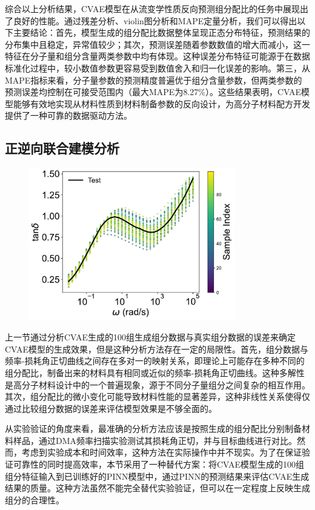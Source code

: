 综合以上分析结果，CVAE模型在从流变学性质反向预测组分配比的任务中展现出了良好的性能。通过残差分析、violin图分析和MAPE定量分析，我们可以得出以下主要结论：首先，模型生成的组分配比数据整体呈现正态分布特征，预测结果的分布集中且稳定，异常值较少；其次，预测误差随着参数数值的增大而减小，这一特征在分子量和组分含量两类参数中均有体现。这种误差分布特征可能源于在数据标准化过程中，较小数值参数更容易受到数值舍入和归一化误差的影响。第三，从MAPE指标来看，分子量参数的预测精度普遍优于组分含量参数，但两类参数的预测误差均控制在可接受范围内（最大MAPE为8.27\%）。这些结果表明，CVAE模型能够有效地实现从材料性质到材料制备参数的反向设计，为高分子材料配方开发提供了一种可靠的数据驱动方法。

\subsection{正逆向联合建模分析}
\begin{figure}[htbp]
  \centering
  \includegraphics[width=0.8\textwidth]{Fig/prediction_results.pdf}
\end{figure}
上一节通过分析CVAE生成的100组生成组分数据与真实组分数据的误差来确定CVAE模型的生成效果，但是这种分析方法存在一定的局限性。首先，组分数据与频率-损耗角正切曲线之间存在多对一的映射关系，即理论上可能存在多种不同的组分配比，制备出来的材料具有相同或近似的频率-损耗角正切曲线。这种多解性是高分子材料设计中的一个普遍现象，源于不同分子量组分之间复杂的相互作用。其次，组分配比的微小变化可能导致材料性能的显著差异，这种非线性关系使得仅通过比较组分数据的误差来评估模型效果是不够全面的。

从实验验证的角度来看，最准确的分析方法应该是按照生成的组分配比分别制备材料样品，通过DMA频率扫描实验测试其损耗角正切，并与目标曲线进行对比。然而，考虑到实验成本和时间效率，这种方法在实际操作中并不现实。为了在保证验证可靠性的同时提高效率，本节采用了一种替代方案：将CVAE模型生成的100组组分特征输入到已训练好的PINN模型中，通过PINN的预测结果来评估CVAE生成结果的质量。这种方法虽然不能完全替代实验验证，但可以在一定程度上反映生成组分的合理性。

